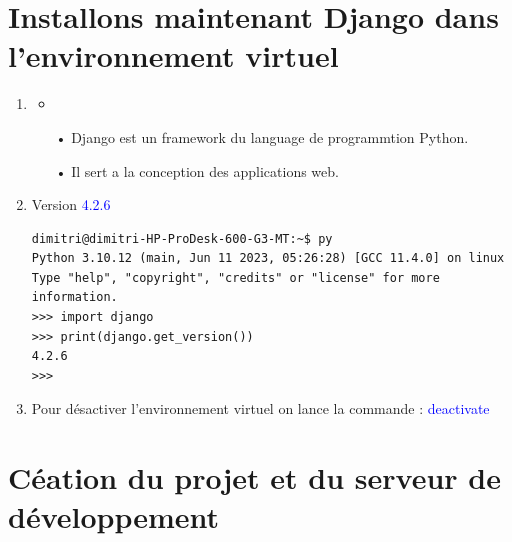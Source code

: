 \documentclass[10pt,a4paper]{article}
\begin{document}
\section{Installons maintenant Django dans l'environnement virtuel}
\begin{enumerate}
\item 
\begin{itemize}
\item
\item[•] Django est un framework du language de programmtion Python.
\item[•] Il sert a la conception des applications web.
\end{itemize}
\item Version \textcolor{blue}{4.2.6}
\begin{verbatim}
dimitri@dimitri-HP-ProDesk-600-G3-MT:~$ py
Python 3.10.12 (main, Jun 11 2023, 05:26:28) [GCC 11.4.0] on linux
Type "help", "copyright", "credits" or "license" for more information.
>>> import django
>>> print(django.get_version())
4.2.6
>>> 

\end{verbatim}
\item Pour désactiver l'environnement virtuel on lance la commande :  \textcolor{blue}{deactivate}
\end{enumerate}
\section{Céation du projet et du serveur de développement}
\end{document}
